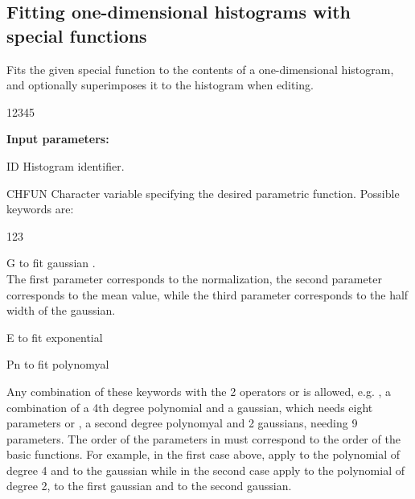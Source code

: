 \newpage%

\subsection{Fitting one-dimensional histograms with special functions}


\Action
Fits the given special function to the contents of a
one-dimensional histogram, and optionally superimposes
it to the histogram when editing.
 
\begin{DLtt}{12345}
\item[{\rm\bf Input parameters:}]
\item[ID] Histogram identifier.
\item[CHFUN] Character variable specifying the desired parametric function.
      Possible keywords are:
      \begin{DLtt}{123}
      \item[G] to fit gaussian .\\
      The first parameter  corresponds to the normalization,
      the second parameter  corresponds to the mean value, while
      the third parameter  corresponds to the half width of the 
      gaussian.
      \item[E] to fit exponential 
      \item[Pn] to fit polynomyal 
      \end{DLtt}
      Any combination of these keywords with the 2 operators \Lit{+} or \Lit{*}
      is allowed, e.g. , a combination of a 4th degree polynomial
      and a gaussian, which needs eight parameters or
      , a second degree polynomyal and 2 gaussians,
      needing 9 parameters.
      The order of the parameters in  must
      correspond to the order of the basic functions.
      For example, in the first case above,  apply to
      the polynomial of degree 4 and  to the gaussian while
      in the second case  apply to the polynomial of degree 2,
       to the first gaussian and  to the second gaussian.

\end{DLtt}
